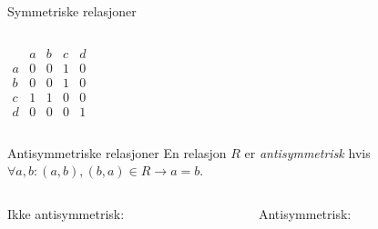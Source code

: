 \begin{frame}[fragile]{Symmetriske relasjoner}
\begin{columns}
\begin{column}{0.3\textwidth}
\begin{math}
                \begin{matrix}
                      & a & b & c & d\\
                    a & 0 & 0 & 1 & 0\\
                    b & 0 & 0 & 1 & 0\\
                    c & 1 & 1 & 0 & 0\\
                    d & 0 & 0 & 0 & 1
                \end{matrix}
            \end{math}
        \end{column}
    \end{columns}
\end{frame}

\begin{frame}[fragile]{Antisymmetriske relasjoner}
    En relasjon $R$ er \emph{antisymmetrisk} hvis $\forall a, b : (a, b), (b, a) \in R \rightarrow a = b$.\\
    \begin{columns}
        \begin{column}{0.3\textwidth}
            Ikke antisymmetrisk:\\
        \end{column}
        \pause
        \begin{column}{0.3\textwidth}
            Antisymmetrisk:\\
        \end{column}
    \end{columns}

\end{frame}

